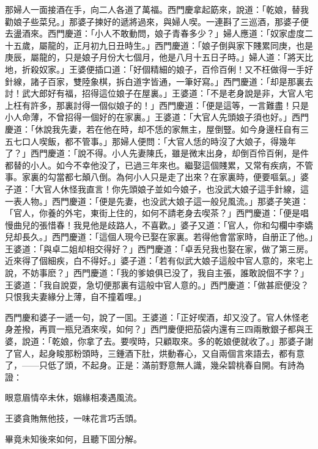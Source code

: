 那婦人一面接酒在手，向二人各道了萬福。西門慶拿起筯來，說道：「乾娘，替我勸娘子些菜兒。」那婆子揀好的遞將過來，與婦人喫。一連斟了三巡酒，那婆子便去盪酒來。西門慶道：「小人不敢動問，娘子青春多少？」婦人應道：「奴家虚度二十五歲，屬龍的，正月初九日丑時生。」西門慶道：「娘子倒與家下賤累同庚，也是庚辰，屬龍的，只是娘子月份大七個月，他是八月十五日子時。」婦人道：「將天比地，折殺奴家。」王婆便插口道：「好個精細的娘子，百伶百俐！又不枉做得一手好針線，諸子百家，雙陸象棋，拆白道字皆通，一筆好寫。」西門慶道：「却是那裏去討！武大郎好有福，招得這位娘子在屋裏。」王婆道：「不是老身說是非，大官人宅上枉有許多，那裏討得一個似娘子的！」西門慶道：「便是這等，一言難盡！只是小人命薄，不曾招得一個好的在家裏。」王婆道：「大官人先頭娘子須也好。」西門慶道：「休說我先妻，若在他在時，却不恁的家無主，屋倒豎。如今身邊枉自有三五七口人喫飯，都不管事。」那婦人便問：「大官人恁的時沒了大娘子，得幾年了？」西門慶道：「說不得。小人先妻陳氏，雖是微末出身，却倒百伶百俐，是件都替的小人。如今不幸他没了，已過三年來也。繼娶這個賤累，又常有疾病，不管事。家裏的勾當都七顛八倒。為何小人只是走了出來？在家裏時，便要嘔氣。」婆子道：「大官人休怪我直言！你先頭娘子並如今娘子，也没武大娘子這手針線，這一表人物。」西門慶道：「便是先妻，也没武大娘子這一般兒風流。」那婆子笑道：「官人，你養的外宅，東街上住的，如何不請老身去喫茶？」西門慶道：「便是唱慢曲兒的張惜春！我見他是歧路人，不喜歡。」婆子又道：「官人，你和勾欄中李嬌兒却長久。」西門慶道：「這個人現今已娶在家裏。若得他會當家時，自册正了他。」王婆道：「與卓二姐却相交得好？」西門慶道：「卓丢兒我也娶在家，做了第三房。近來得了個細疾，白不得好。」婆子道：「若有似武大娘子這般中官人意的，來宅上說，不妨事麽？」西門慶道：「我的爹娘俱已没了，我自主張，誰敢說個不字？」王婆道：「我自說耍，急切便那裏有這般中官人意的。」西門慶道：「做甚麽便没？只恨我夫妻緣分上薄，自不撞着哩。」

西門慶和婆子一遞一句，說了一囬。王婆道：「正好喫酒，却又没了。官人休怪老身差撥，再買一瓶兒酒來喫，如何？」西門慶便把茄袋内還有三四兩散銀子都與王婆，說道：「乾娘，你拿了去。要喫時，只顧取來。多的乾娘便就收了。」那婆子謝了官人，起身睃那粉頭時，三鍾酒下肚，烘動春心，又自兩個言來語去，都有意了，——只低了頭，不起身。正是：滿前野意無人識，幾朵碧桃春自開。有詩為證：

\begin{myquote}
眼意眉情卒未休，姻緣相凑遇風流。

王婆貪賄無他技，一味花言巧舌頭。
\end{myquote}

畢竟未知後來如何，且聽下囬分解。

